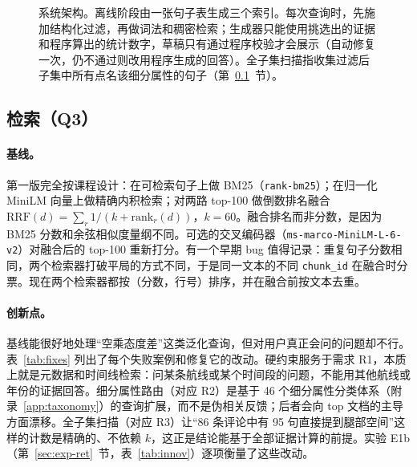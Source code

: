 \documentclass[10pt,twocolumn,a4paper]{article}
\newcommand{\sref}[1]{第~\ref{#1}~节}
\begin{document}
\begin{figure}[t]
{}
\caption{系统架构。离线阶段由一张句子表生成三个索引。每次查询时，先施加结构化过滤，再做词法和稠密检索；生成器只能使用挑选出的证据和程序算出的统计数字，草稿只有通过程序校验才会展示（自动修复一次，仍不通过则改用程序生成的回答）。全子集扫描指收集过滤后子集中所有点名该细分属性的句子（\sref{sec:ret}）。}
\label{fig:arch}
\end{figure}

\subsection{检索（Q3）}
\label{sec:ret}

\paragraph{基线。}第一版完全按课程设计：在可检索句子上做 BM25（\texttt{rank-bm25}）；在归一化 MiniLM 向量上做精确内积检索；对两路 top-100 做倒数排名融合 $\mathrm{RRF}(d)=\sum_r 1/(k+\mathrm{rank}_r(d))$，$k=60$。融合排名而非分数，是因为 BM25 分数和余弦相似度量纲不同。可选的交叉编码器（\nolinkurl{ms-marco-MiniLM-L-6-v2}）对融合后的 top-100 重新打分。有一个早期 bug 值得记录：重复句子分数相同，两个检索器打破平局的方式不同，于是同一文本的不同 \nolinkurl{chunk_id} 在融合时分票。现在两个检索器都按（分数，行号）排序，并在融合前按文本去重。

\paragraph{创新点。}基线能很好地处理“空乘态度差”这类泛化查询，但对用户真正会问的问题却不行。表~\ref{tab:fixes} 列出了每个失败案例和修复它的改动。硬约束服务于需求 R1，本质上就是元数据和时间线检索：问某条航线或某个时间段的问题，不能用其他航线或年份的证据回答。细分属性路由（对应 R2）是基于 46 个细分属性分类体系（附录~\ref{app:taxonomy}）的查询扩展，而不是伪相关反馈；后者会向 top 文档的主导方面漂移。全子集扫描（对应 R3）让“86 条评论中有 95 句直接提到腿部空间”这样的计数是精确的、不依赖 $k$，这正是结论能基于全部证据计算的前提。实验 E1b（\sref{sec:exp-ret}，表~\ref{tab:innov}）逐项衡量了这些改动。
\end{document}
